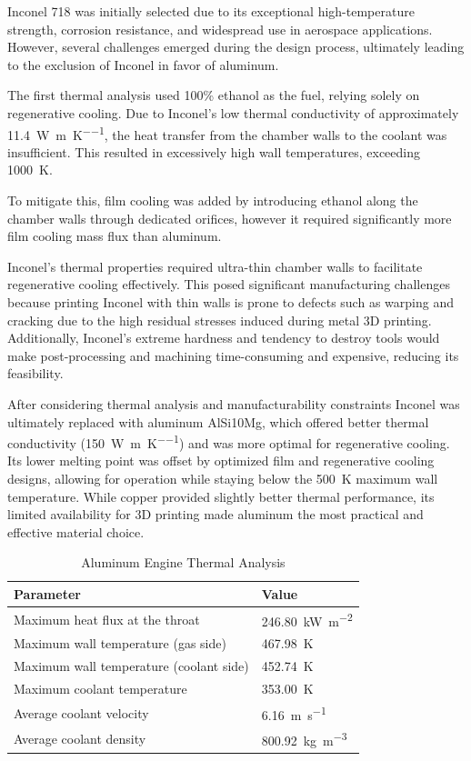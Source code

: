 Inconel 718 was initially selected due to its exceptional high-temperature strength, corrosion resistance, and widespread use in aerospace applications. However, several challenges emerged during the design process, ultimately leading to the exclusion of Inconel in favor of aluminum.

The first thermal analysis used 100\% ethanol as the fuel, relying solely on regenerative cooling. Due to Inconel’s low thermal conductivity of approximately \SI{11.4}{\watt\per\meter\per\kelvin}, the heat transfer from the chamber walls to the coolant was insufficient. This resulted in excessively high wall temperatures, exceeding \SI{1000}{\kelvin}.

To mitigate this, film cooling was added by introducing ethanol along the chamber walls through dedicated orifices, however it required significantly more film cooling mass flux than aluminum. 

Inconel’s thermal properties required ultra-thin chamber walls to facilitate regenerative cooling effectively. This posed significant manufacturing challenges because printing Inconel with thin walls is prone to defects such as warping and cracking due to the high residual stresses induced during metal 3D printing. Additionally, Inconel’s extreme hardness and tendency to destroy tools would make post-processing and machining time-consuming and expensive, reducing its feasibility.



After considering thermal analysis and manufacturability constraints Inconel was ultimately replaced with aluminum AlSi10Mg, which offered better thermal conductivity (\SI{150}{\watt\per\meter\per\kelvin}) and was more optimal for regenerative cooling. Its lower melting point was offset by optimized film and regenerative cooling designs, allowing for operation while staying below the \SI{500}{\kelvin} maximum wall temperature. While copper provided slightly better thermal performance, its limited availability for 3D printing made aluminum the most practical and effective material choice.

\begin{table}[h!]
    \centering
    \begin{tabular}{|l|l|}
        \hline
        \textbf{Parameter} & \textbf{Value} \\ \hline
        Maximum heat flux at the throat & \SI{246.80}{\kilo\watt\per\meter\squared} \\ \hline
        Maximum wall temperature (gas side) & \SI{467.98}{\kelvin} \\ \hline
        Maximum wall temperature (coolant side) & \SI{452.74}{\kelvin} \\ \hline
        Maximum coolant temperature & \SI{353.00}{\kelvin} \\ \hline
        Average coolant velocity & \SI{6.16}{\meter\per\second} \\ \hline
        Average coolant density & \SI{800.92}{\kilogram\per\meter\cubed} \\ \hline
    \end{tabular}
    \caption{Aluminum Engine Thermal Analysis}
\end{table}


